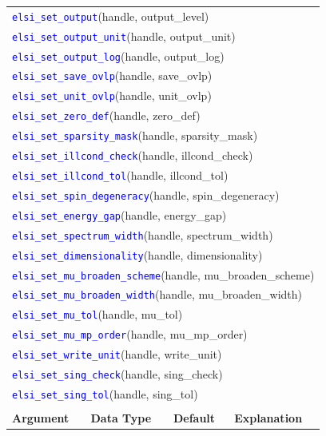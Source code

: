 \documentclass{report}
\newcommand{\api}[1]{\textcolor{blue}{\texttt{#1}}}
\begin{document}
\begin{longtable}[]{|p{30mm}|p{20mm}|p{15mm}|p{97mm}|}
\multicolumn{4}{l}{\api{elsi\_set\_output}(handle, output\_level)}\\
\multicolumn{4}{l}{\api{elsi\_set\_output\_unit}(handle, output\_unit)}\\
\multicolumn{4}{l}{\api{elsi\_set\_output\_log}(handle, output\_log)}\\
\multicolumn{4}{l}{\api{elsi\_set\_save\_ovlp}(handle, save\_ovlp)}\\
\multicolumn{4}{l}{\api{elsi\_set\_unit\_ovlp}(handle, unit\_ovlp)}\\
\multicolumn{4}{l}{\api{elsi\_set\_zero\_def}(handle, zero\_def)}\\
\multicolumn{4}{l}{\api{elsi\_set\_sparsity\_mask}(handle, sparsity\_mask)}\\
\multicolumn{4}{l}{\api{elsi\_set\_illcond\_check}(handle, illcond\_check)}\\
\multicolumn{4}{l}{\api{elsi\_set\_illcond\_tol}(handle, illcond\_tol)}\\
\multicolumn{4}{l}{\api{elsi\_set\_spin\_degeneracy}(handle, spin\_degeneracy)}\\
\multicolumn{4}{l}{\api{elsi\_set\_energy\_gap}(handle, energy\_gap)}\\
\multicolumn{4}{l}{\api{elsi\_set\_spectrum\_width}(handle, spectrum\_width)}\\
\multicolumn{4}{l}{\api{elsi\_set\_dimensionality}(handle, dimensionality)}\\
\multicolumn{4}{l}{\api{elsi\_set\_mu\_broaden\_scheme}(handle, mu\_broaden\_scheme)}\\
\multicolumn{4}{l}{\api{elsi\_set\_mu\_broaden\_width}(handle, mu\_broaden\_width)}\\
\multicolumn{4}{l}{\api{elsi\_set\_mu\_tol}(handle, mu\_tol)}\\
\multicolumn{4}{l}{\api{elsi\_set\_mu\_mp\_order}(handle, mu\_mp\_order)}\\
\multicolumn{4}{l}{\api{elsi\_set\_write\_unit}(handle, write\_unit)}\\
\multicolumn{4}{l}{\api{elsi\_set\_sing\_check}(handle, sing\_check)}\\
\multicolumn{4}{l}{\api{elsi\_set\_sing\_tol}(handle, sing\_tol)}\\
\multicolumn{4}{l}{}\\
\hline
\multicolumn{1}{|l|}{\textbf{Argument}} & \multicolumn{1}{l|}{\textbf{Data Type}} & \multicolumn{1}{l|}{\textbf{Default}} & \multicolumn{1}{l|}{\textbf{Explanation}}\\

\end{longtable}
\end{document}
